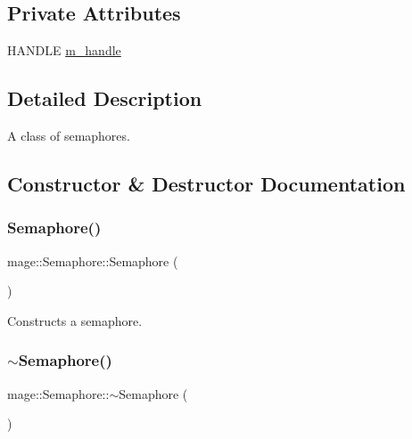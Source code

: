 \subsection*{Private Attributes}
\begin{DoxyCompactItemize}
\item 
H\+A\+N\+D\+LE \hyperlink{classmage_1_1_semaphore_ac1ded856984b4ac3739d9ff627838fda}{m\+\_\+handle}
\end{DoxyCompactItemize}


\subsection{Detailed Description}
A class of semaphores. 

\subsection{Constructor \& Destructor Documentation}
\hypertarget{classmage_1_1_semaphore_a7b4f53c18b9a244ed98ef58fa5cfa2bb}{}\label{classmage_1_1_semaphore_a7b4f53c18b9a244ed98ef58fa5cfa2bb} 
\subsubsection{\texorpdfstring{Semaphore()}{Semaphore()}\hspace{0.1cm}{\footnotesize\ttfamily [1/3]}}
{\footnotesize\ttfamily mage\+::\+Semaphore\+::\+Semaphore (\begin{DoxyParamCaption}{ }\end{DoxyParamCaption})}

Constructs a semaphore. \hypertarget{classmage_1_1_semaphore_a991ed365c28e4a9c63ff34a5efeb012d}{}\label{classmage_1_1_semaphore_a991ed365c28e4a9c63ff34a5efeb012d} 
\subsubsection{\texorpdfstring{$\sim$\+Semaphore()}{~Semaphore()}}
{\footnotesize\ttfamily mage\+::\+Semaphore\+::$\sim$\+Semaphore (\begin{DoxyParamCaption}{ }\end{DoxyParamCaption})}

